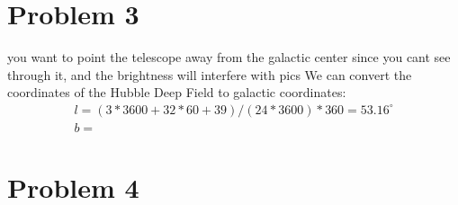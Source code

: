 \documentclass[11pt,letterpaper]{article}
\begin{document}
\section*{Problem 3}
{\huge you want to point the telescope away from the galactic center since you cant see through it, and the brightness will interfere with pics}
We can convert the coordinates of the Hubble Deep Field to galactic coordinates:  
\begin{align*}
    l = (3*3600 + 32*60 + 39) / (24*3600) * 360 = 53.16^\circ \\
    b = 
\end{align*}
\section*{Problem 4} 
\end{document}
